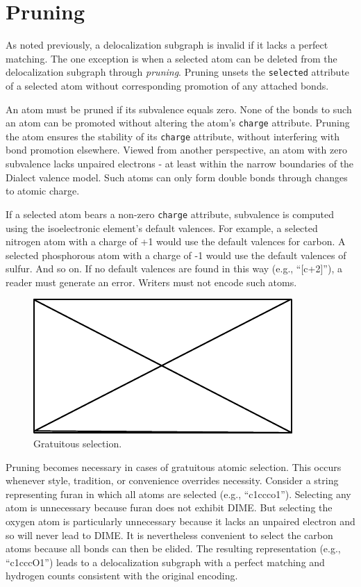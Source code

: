 \documentclass{article}
\def\ttt{\texttt}
\begin{document}
\section*{Pruning}

As noted previously, a delocalization subgraph is invalid if it lacks a perfect matching. The one exception is when a selected atom can be deleted from the delocalization subgraph through \textit{pruning}. Pruning unsets the \ttt{selected} attribute of a selected atom without corresponding promotion of any attached bonds.

An atom must be pruned if its subvalence equals zero. None of the bonds to such an atom can be promoted without altering the atom's \ttt{charge} attribute. Pruning the atom ensures the stability of its \ttt{charge} attribute, without interfering with bond promotion elsewhere. Viewed from another perspective, an atom with zero subvalence lacks unpaired electrons - at least within the narrow boundaries of the Dialect valence model. Such atoms can only form double bonds through changes to atomic charge. 

If a selected atom bears a non-zero \ttt{charge} attribute, subvalence is computed using the isoelectronic element's default valences. For example, a selected nitrogen atom with a charge of +1 would use the default valences for carbon. A selected phosphorous atom with a charge of -1 would use the default valences of sulfur. And so on. If no default valences are found in this way (e.g., \enquote{[c+2]}), a reader must generate an error. Writers must not encode such atoms.

\begin{figure}
    \centering
    \includegraphics{filler}
    \caption{Gratuitous selection.}
    \label{fig:gratuitous-selection}
\end{figure}

Pruning becomes necessary in cases of gratuitous atomic selection. This occurs whenever style, tradition, or convenience overrides necessity. Consider a string representing furan in which all atoms are selected (e.g., \enquote{c1ccco1}). Selecting any atom is unnecessary because furan does not exhibit DIME. But selecting the oxygen atom is particularly unnecessary because it lacks an unpaired electron and so will never lead to DIME. It is nevertheless convenient to select the carbon atoms because all bonds can then be elided. The resulting representation (e.g., \enquote{c1cccO1}) leads to a delocalization subgraph with a perfect matching and hydrogen counts consistent with the original encoding.
\end{document}
